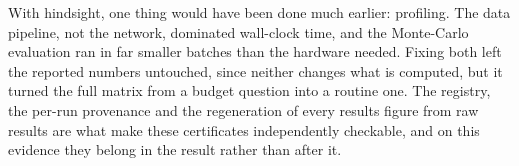 With hindsight, one thing would have been done much earlier: profiling. The data
pipeline, not the network, dominated wall-clock time, and the Monte-Carlo
evaluation ran in far smaller batches than the hardware needed. Fixing both left
the reported numbers untouched, since neither changes what is computed, but it
turned the full matrix from a budget question into a routine one. The registry,
the per-run provenance and the regeneration of every results figure from raw results are
what make these certificates independently checkable, and on this evidence they
belong in the result rather than after it.

